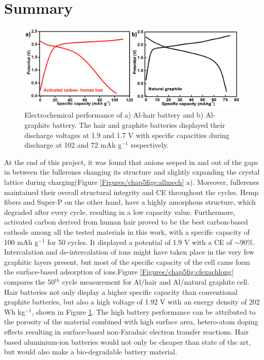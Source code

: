 \section{Summary}
\begin{figure}[h]
\centering
\includegraphics[width=\textwidth]{Figures/chap5fig/hairgraph}
\caption{Electrochemical performance of a) Al-hair battery and b) Al-graphite battery. The hair and graphite batteries displayed their discharge voltages at 1.9 and 1.7 V with specific capacities during discharge at 102 and 72 mAh g$^{-1}$ respectively.}
 \label{Figures/chap5fig:hairgraph}
\end{figure}
At the end of this project, it was found that  anions seeped in and out of the gaps in between the fullerenes changing its structure and slightly expanding the crystal lattice during charging(Figure \ref{Figures/chap5figs:allmech} a). Moreover, fullerenes maintained their overall structural integrity and CE throughout the cycles. Hemp fibers and Super-P on the other hand, have a highly amorphous structure, which degraded after every cycle, resulting in a low capacity value. Furthermore, activated carbon derived from human hair proved to be the best carbon-based cathode among all the tested materials in this work, with a specific capacity of 100 mAh g$^{-1}$ for 50 cycles. It displayed a potential of 1.9 V with a CE of $\sim$90$\%$. Intercalation and de-intercalation of  ions might have taken place in the very few graphitic layers present, but most of the specific capacity of the cell came form the surface-based adsorption of ions.Figure \ref{Figures/chap5fig:cfexachlong} compares the 50$^{th}$ cycle measurement for Al/hair and Al/natural graphite cell. Hair batteries not only display a higher specific capacity than conventional graphite batteries, but also a high voltage of 1.92 V with an energy density of 202 Wh kg$^{-1}$, shown in Figure \ref{Figures/chap5fig:hairgraph}. The high battery performance can be attributed to the porosity of the material combined with high surface area, hetero-atom doping effects resulting in surface-based non-Faradaic electron transfer reactions. Hair based aluminium-ion batteries would not only be cheaper than state of the art, but would also make a bio-degradable battery material.
